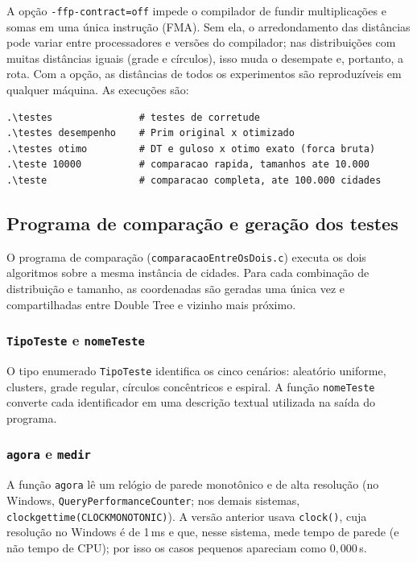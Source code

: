 \documentclass[11pt,a4paper]{article}
\renewcommand{\_}{\underscoreoriginal\allowbreak}
\begin{document}
A opção \texttt{-ffp-contract=off} impede o compilador de fundir
multiplicações e somas em uma única instrução (FMA). Sem ela, o
arredondamento das distâncias pode variar entre processadores e versões
do compilador; nas distribuições com muitas distâncias iguais (grade e
círculos), isso muda o desempate e, portanto, a rota. Com a opção, as
distâncias de todos os experimentos são reproduzíveis em qualquer
máquina. As execuções são:

\begin{lstlisting}
.\testes               # testes de corretude
.\testes desempenho    # Prim original x otimizado
.\testes otimo         # DT e guloso x otimo exato (forca bruta)
.\teste 10000          # comparacao rapida, tamanhos ate 10.000
.\teste                # comparacao completa, ate 100.000 cidades
\end{lstlisting}

\subsection{Programa de comparação e geração dos testes}
\label{sec:comparacao}

O programa de comparação (\texttt{comparacaoEntreOsDois.c}) executa os
dois algoritmos sobre a mesma instância de cidades. Para cada combinação
de distribuição e tamanho, as coordenadas são geradas uma única vez e
compartilhadas entre Double Tree e vizinho mais próximo.

\subsubsection{\texttt{TipoTeste} e \texttt{nomeTeste}}

O tipo enumerado \texttt{TipoTeste} identifica os cinco cenários:
aleatório uniforme, clusters, grade regular, círculos concêntricos e
espiral. A função \texttt{nomeTeste} converte cada identificador em uma
descrição textual utilizada na saída do programa.

\subsubsection{\texttt{agora} e \texttt{medir}}
\label{sec:medicao}

A função \texttt{agora} lê um relógio de parede monotônico e de alta
resolução (no Windows, \texttt{Query\-Performance\-Counter};
nos demais sistemas, \texttt{clock\_gettime(CLOCK\_MONOTONIC)}). A versão
anterior usava \texttt{clock()}, cuja resolução no Windows é de 1\,ms e
que, nesse sistema, mede tempo de parede (e não tempo de CPU); por isso
os casos pequenos apareciam como $0{,}000$\,s.
\end{document}
